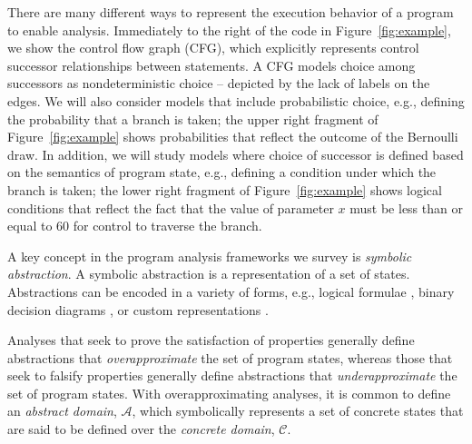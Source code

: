 There are many different ways to represent the execution behavior
of a program to enable analysis.  Immediately to the right of
the code in Figure~\ref{fig:example}, we show the control flow graph (CFG),
which explicitly represents control successor relationships between
statements.  A CFG models choice among successors as nondeterministic
choice -- depicted by the lack of labels on the edges.
We will also consider models that include probabilistic choice,
e.g., defining the probability that a branch is taken; the
upper right fragment of Figure~\ref{fig:example} shows probabilities
that reflect the outcome of the Bernoulli draw.
In addition, we will study models where 
choice of successor is defined based on the semantics
of program state, e.g., defining a condition under which the branch
is taken; the lower right fragment of Figure~\ref{fig:example}
shows logical conditions that 
reflect the fact that the value of parameter $x$ must be
less than or equal to $60$ for control to traverse the branch.

A key concept in the program analysis frameworks we survey is
\textit{symbolic abstraction}.  A symbolic abstraction is a 
representation of a set of states.  Abstractions can be encoded
in a variety of forms, e.g., logical formulae \cite{thakur2012bilateral}, binary
decision diagrams \cite{bryant1992symbolic}, or custom representations \cite{bagnara2008parma}.

Analyses that seek to prove the satisfaction of properties generally
define abstractions that \textit{overapproximate} the set of program
states, whereas those that seek to falsify properties generally define
abstractions that \textit{underapproximate} the set of program states.
With overapproximating analyses, it is common to define an \textit{abstract
domain}, $\mathcal{A}$, 
which symbolically represents a set of concrete states that
are said to be defined over the \textit{concrete domain}, $\mathcal{C}$.


